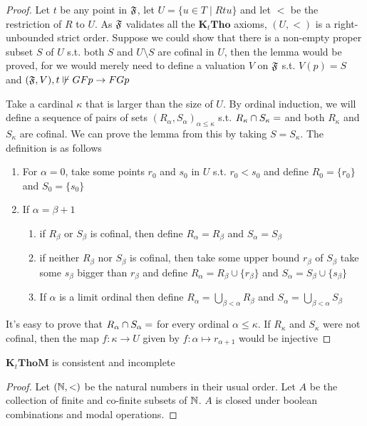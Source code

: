 \documentclass[11pt]{article}
\newcommand{\KtTho}{\textbf{K}_t\textbf{Tho}}
\newcommand{\KtThoM}{\textbf{K}_t\textbf{ThoM}}
\begin{document}
\begin{proof}
Let \(t\) be any point in \(\mathfrak{F}\), let \(U=\{u\in T\mid Rtu\}\) and let \(<\)
be the restriction of \(R\) to \(U\). As \(\mathfrak{F}\) validates all the \(\KtTho\)
axioms, \((U,<)\) is a right-unbounded strict order. Suppose we could show
that there is a non-empty proper subset \(S\) of \(U\) s.t. both \(S\) and
\(U\setminus S\) are cofinal in \(U\), then the lemma would be proved, for we
would merely need to define a valuation \(V\) on \(\mathfrak{F}\) s.t. \(V(p)=S\) and
\((\mathfrak{F},V),t\not\Vdash GFp\to FGp\)

Take a cardinal \(\kappa\) that is larger than the size of \(U\). By ordinal
induction, we will define a sequence of pairs of sets
\((R_\alpha,S_\alpha)_{\alpha\le\kappa}\) s.t. \(R_\kappa\cap
   S_\kappa=\empty\) and both \(R_\kappa\) and \(S_\kappa\) are cofinal. We can
prove the lemma from this by taking \(S=S_\kappa\). The definition is as
follows
\begin{enumerate}
\item For \(\alpha=0\), take some points \(r_0\) and \(s_0\) in \(U\) s.t.
\(r_0<s_0\) and define \(R_0=\{r_0\}\) and \(S_0=\{s_0\}\)
\item If \(\alpha=\beta+1\)
\begin{enumerate}
\item if \(R_\beta\) or \(S_\beta\) is cofinal, then define
\(R_\alpha=R_\beta\) and \(S_\alpha=S_\beta\)
\item if neither \(R_\beta\) nor \(S_\beta\) is cofinal, then take some upper
bound \(r_\beta\) of \(S_\beta\) take some \(s_\beta\) bigger than
\(r_\beta\) and define \(R_\alpha=R_\beta\cup\{r_\beta\}\) and \(S_\alpha=S_\beta\cup\{s_\beta\}\)
\item If \(\alpha\) is a limit ordinal then define \(R_\alpha=\bigcup_{\beta<\alpha}R_\beta\)
and \(S_\alpha=\bigcup_{\beta<\alpha}S_\beta\)
\end{enumerate}
\end{enumerate}


It's easy to prove that \(R_\alpha\cap S_\alpha=\empty\) for every ordinal
\(\alpha\le\kappa\). If \(R_\kappa\) and \(S_\kappa\) were not cofinal, then
the map \(f:\kappa\to U\) given by \(f:\alpha\mapsto r_{\alpha+1}\) would be injective
\end{proof}

\begin{theorem}[]
\(\KtThoM\) is consistent and incomplete
\end{theorem}

\begin{proof}
Let \((\mathbb{N},<)\) be the natural numbers in their usual order. Let \(A\) be the
collection of finite and co-finite subsets of \(\mathbb{N}\). \(A\) is closed under
boolean combinations and modal operations.
\end{proof}
\end{document}
